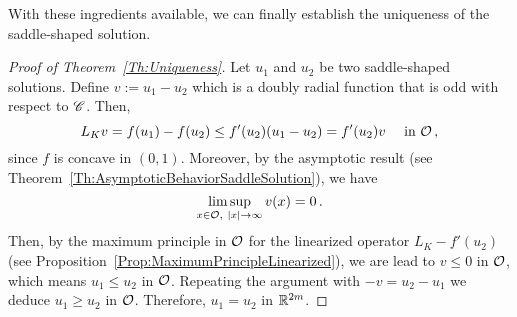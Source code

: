 With these ingredients available, we can finally establish the uniqueness of the saddle-shaped solution.



\begin{proof}[Proof of Theorem~\ref{Th:Uniqueness}]
	Let $u_1$ and $u_2$ be two saddle-shaped solutions. Define $v := u_1 - u_2$ which is a doubly radial function that is odd with respect to $\mathscr{C}$. Then,
	$$
	L_K v = f(u_1) - f(u_2) \leq f'(u_2) (u_1 - u_2) = f'(u_2) v \quad \textrm{ in } \mathcal{O}\,,
	$$
	since $f$ is concave in $(0,1)$. Moreover, by the asymptotic result (see Theorem~\ref{Th:AsymptoticBehaviorSaddleSolution}), we have
	$$
	\limsup_{x\in \mathcal{O}, \ |x|\to \infty} v(x) = 0\,.
	$$
	Then, by the maximum principle in $\mathcal{O}$ for the linearized operator $L_K  - f'(u_2)$ (see Proposition~\ref{Prop:MaximumPrincipleLinearized}), we are lead to $v \leq 0$ in $\mathcal{O}$, which means $u_1 \leq u_2$ in $\mathcal{O}$. Repeating the  argument with $-v = u_2 - u_1$ we deduce $u_1 \geq u_2$ in $\mathcal{O}$. Therefore, $u_1 = u_2$ in $\mathbb{R}^{2m}$.
\end{proof}


